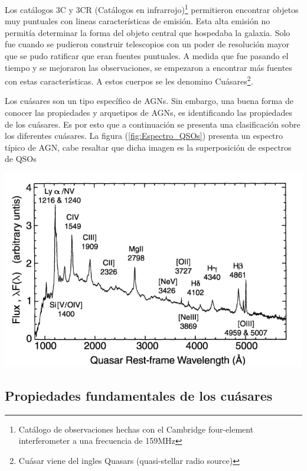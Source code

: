 Los catálogos 3C y 3CR (Catálogos en infrarrojo)\footnote{Catálogo de observaciones hechas con el Cambridge four-element interferometer a una frecuencia de 159MHz} permitieron encontrar objetos muy puntuales 
con lineas características de emisión. 
Esta alta emisión no permitía determinar la forma del objeto central que hospedaba la galaxia. Solo fue cuando se pudieron construir telescopios con un poder de resolución mayor que se pudo ratificar que eran fuentes puntuales. A medida que fue pasando el tiempo y se mejoraron  las observaciones, se empezaron a encontrar más fuentes con estas características. A estos cuerpos se les denomino  Cuásares\footnote{Cuásar viene del ingles Quasars (quasi-stellar radio source)}.

Los cuásares son un tipo específico de AGNs. Sin embargo, una buena forma de conocer las propiedades y arquetipos de  AGNs, es identificando las propiedades de los cuásares. Es por esto que a continuación se presenta una clasificación sobre los diferentes cuásares.  La figura (\ref{fig:Espectro_QSOs}) presenta un espectro típico de AGN, cabe resaltar que dicha imagen es la superposición de espectros de QSOs

\begin{center}
\includegraphics[scale=.3]{./figures/3_AGNs/Espectro_tipico_AGN.png}
\label{fig:Espectro_QSOs}
\end{center}
	\subsection{Propiedades fundamentales de los cuásares}
	\label{subsec:Fundamental_properties_quasars}

